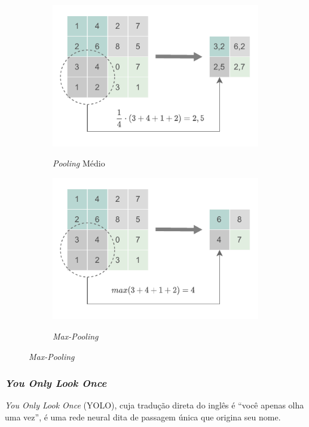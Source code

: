 \begin{figure}[h!]
    \centering
    \caption{Exemplos de funções utilizadas para operação de \textit{pooling}.}
    \begin{subfigure}[H]{.5\textwidth}
        \centering
        \caption{\textit{Pooling} Médio}
        \includegraphics[scale=1.1]{img/img-fundamentacao-av-pool.pdf}
        \label{fig:fund-pool-av}
    \end{subfigure}
    \begin{subfigure}[H]{.5\textwidth}
        \centering
        \caption{\textit{Max-Pooling}}
        \includegraphics[scale=1.1]{img/img-fundamentacao-max-pool.pdf}
        \label{fig:fund-pool-max}
    \end{subfigure}
	\label{fig:fund-pool}
\end{figure}

\subsubsection{\textit{You Only Look Once}} \label{cap:fund-ia-rn-yolo}
\textit{You Only Look Once} (YOLO), cuja tradução direta do inglês é ``você apenas olha uma vez'', é uma rede neural dita de passagem única \cite{ref:Yan} que origina seu nome.



